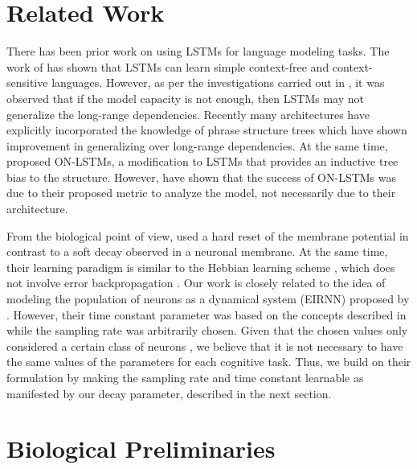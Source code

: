 \documentclass[11pt,a4paper]{article}
\begin{document}
\section{Related Work}
\label{sec:Related Work}
There has been prior work on using LSTMs \cite{hochreiter1997long} for language modeling tasks. The work of \citet{gers2001lstm} has shown that LSTMs can learn simple context-free and context-sensitive languages. However, as per the investigations carried out in \citet{kuncoro-etal-2018-lstms}, it was observed that if the model capacity is not enough, then LSTMs may not generalize the long-range dependencies. Recently many architectures have explicitly incorporated the knowledge of phrase structure trees \cite{kuncoro-etal-2018-lstms, alvarez2016tree, tai-etal-2015-improved} which have shown improvement in generalizing over long-range dependencies. At the same time, \citet{shen2018ordered} proposed ON-LSTMs, a modification to LSTMs that provides an inductive tree bias to the structure. However, \citet{dyer2019critical} have shown that the success of ON-LSTMs was due to their proposed metric to analyze the model, not necessarily due to their architecture. 

From the biological point of view, \citet{capano2015optimal} used a hard reset of the membrane potential in contrast to a soft decay observed in a neuronal membrane. At the same time, their learning paradigm is similar to the Hebbian learning scheme \cite{hebb1949organization}, which does not involve error backpropagation \cite{rumelhart1986learning}.
Our work is closely related to the idea of modeling the population of neurons as a dynamical system (EIRNN) proposed by \citet{song2016training}. However, their time constant parameter was based on the concepts described in \citet{wang2002probabilistic} while the sampling rate was arbitrarily chosen. Given that the chosen values only considered a certain class of neurons \cite{yang2019task}, we believe that it is not necessary to have the same values of the parameters for each cognitive task. Thus, we build on their formulation by making the sampling rate and time constant learnable as manifested by our decay parameter, described in the next section. 


\section{Biological Preliminaries}
\end{document}
